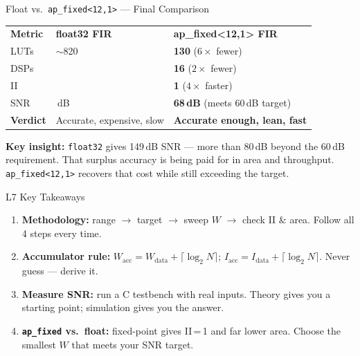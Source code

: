 \documentclass[aspectratio=169,12pt]{beamer}
\begin{document}
\begin{frame}{Float vs.\ \texttt{ap\_fixed<12,1>} --- Final Comparison}
\vspace{0.04cm}
{\setlength{\extrarowheight}{2pt}
\begin{tabular}{p{3.4cm}
                >{\centering}p{3.4cm}
                >{\centering\arraybackslash}p{6.0cm}}
\rowcolor{Navy}
\textbf{\color{white}Metric} &
\textbf{\color{white}float32 FIR} &
\textbf{\color{white}ap\_fixed<12,1> FIR}\\
LUTs            & $\sim$820 & \textbf{130} \quad($6\times$ fewer)\\
DSPs            & 32         & \textbf{16}  \quad($2\times$ fewer)\\
II              & 4          & \textbf{1}   \quad($4\times$ faster)\\
SNR             & 149\,dB   & \textbf{68\,dB} \quad(meets 60\,dB target)\\
\rowcolor{Teal!10}
\textbf{Verdict}& Accurate, expensive, slow &
                  \textbf{Accurate enough, lean, fast}\\
\end{tabular}}
\vspace{0.1cm}
\colorbox{NavyDk!8}{\parbox{\textwidth}{%
  \vspace{2pt}
  {\small\color{NavyDk}
    \textbf{Key insight:} \texttt{float32} gives 149\,dB SNR --- more than 80\,dB
    beyond the 60\,dB requirement.
    That surplus accuracy is being paid for in area and throughput.
    \texttt{ap\_fixed<12,1>} recovers that cost while still exceeding the target.}
  \vspace{2pt}
}}
\end{frame}

\begin{frame}{L7 Key Takeaways}
\begin{enumerate}
  \item \textbf{Methodology:} range $\to$ target $\to$ sweep $W$ $\to$ check II \& area. Follow all 4 steps every time.
  \item \textbf{Accumulator rule:} $W_{\text{acc}} = W_{\text{data}} + \lceil\log_2 N\rceil$;\; $I_{\text{acc}} = I_{\text{data}} + \lceil\log_2 N\rceil$. Never guess --- derive it.
  \item \textbf{Measure SNR:} run a C testbench with real inputs. Theory gives you a starting point; simulation gives you the answer.
  \item \textbf{\texttt{ap\_fixed} vs.\ float:} fixed-point gives II\,=\,1 and far lower area. Choose the smallest $W$ that meets your SNR target.
\end{enumerate}
\end{frame}
\end{document}
